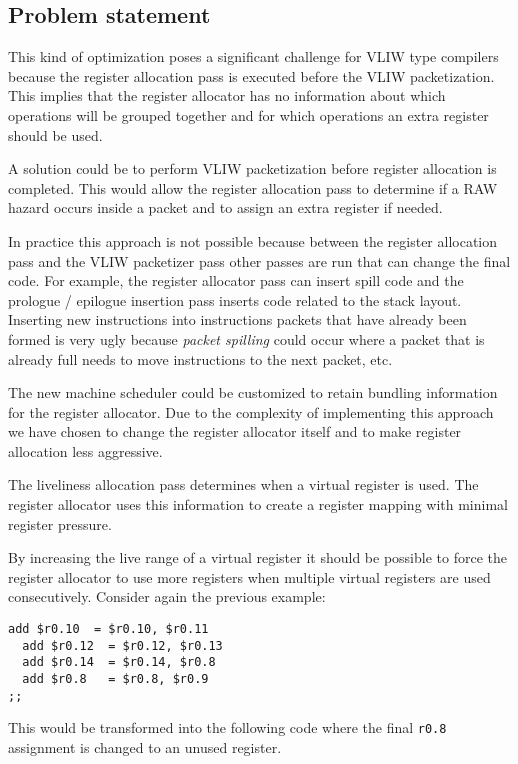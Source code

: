 \subsection{Problem statement}
This kind of optimization poses a significant challenge for VLIW type compilers because the register allocation pass is executed before the VLIW packetization. This implies that the register allocator has no information about which operations will be grouped together and for which operations an extra register should be used.

A solution could be to perform VLIW packetization before register allocation is completed. This would allow the register allocation pass to determine if a RAW hazard occurs inside a packet and to assign an extra register if needed.

In practice this approach is not possible because between the register allocation pass and the VLIW packetizer pass other passes are run that can change the final code. For example, the register allocator pass can insert spill code and the prologue / epilogue insertion pass inserts code related to the stack layout. Inserting new instructions into instructions packets that have already been formed is very ugly because \emph{packet spilling} could occur where a packet that is already full needs to move instructions to the next packet, etc. 

The new machine scheduler could be customized to retain bundling information for the register allocator. Due to the complexity of implementing this approach we have chosen to change the register allocator itself and to make register allocation less aggressive. 

The liveliness allocation pass determines when a virtual register is used. The register allocator uses this information to create a register mapping with minimal register pressure.

By increasing the live range of a virtual register it should be possible to force the register allocator to use more registers when multiple virtual registers are used consecutively. Consider again the previous example:

\begin{lstlisting}[language=rvex]
  add $r0.10  = $r0.10, $r0.11
  add $r0.12  = $r0.12, $r0.13
  add $r0.14  = $r0.14, $r0.8
  add $r0.8   = $r0.8, $r0.9
;;
\end{lstlisting}

This would be transformed into the following code where the final \texttt{r0.8} assignment is changed to an unused register. 

